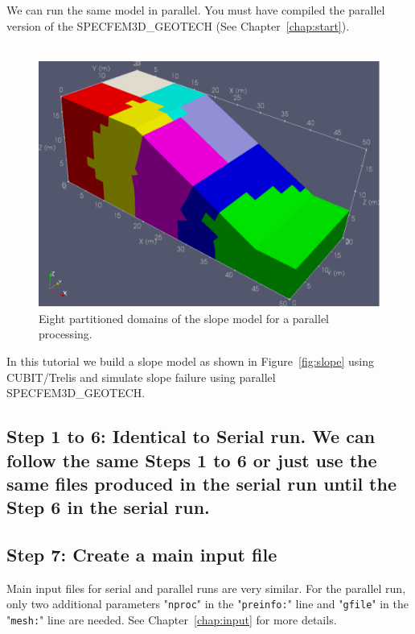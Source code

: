 We can run the same model in parallel. You must have compiled the parallel version of the SPECFEM3D\_GEOTECH (See Chapter~\ref{chap:start}).\\
\\
\begin{figure}[ht]
\centering
\includegraphics[scale=0.7]{cubit_example_parallel}
\caption{Eight partitioned domains of the slope model for a parallel processing.}
\label{fig:par}
\end{figure}

In this tutorial we build a slope model as shown in Figure~\ref{fig:slope} using CUBIT/Trelis and simulate slope failure using parallel SPECFEM3D\_GEOTECH.

\subsection*{Step 1 to 6: Identical to Serial run. We can follow the same Steps 1 to 6 or just use the same files produced in the serial run until the Step 6 in the serial run.}


\subsection*{Step 7: Create a main input file}

Main input files for serial and parallel runs are very similar. For the parallel run, only two additional parameters "\texttt{nproc}" in the "\texttt{preinfo:}" line and "\texttt{gfile}" in the "\texttt{mesh:}" line are needed. See Chapter~\ref{chap:input} for more details.\\
\\

